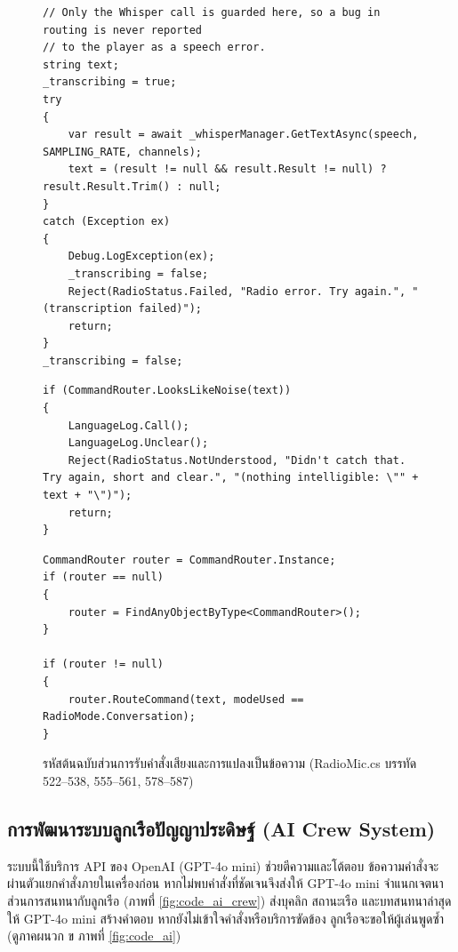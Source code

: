 \begin{figure}[!htbp]
\centering
\begin{lstlisting}[language={[Sharp]C},basicstyle=\ttfamily\footnotesize,firstnumber=522]
// Only the Whisper call is guarded here, so a bug in routing is never reported
// to the player as a speech error.
string text;
_transcribing = true;
try
{
    var result = await _whisperManager.GetTextAsync(speech, SAMPLING_RATE, channels);
    text = (result != null && result.Result != null) ? result.Result.Trim() : null;
}
catch (Exception ex)
{
    Debug.LogException(ex);
    _transcribing = false;
    Reject(RadioStatus.Failed, "Radio error. Try again.", "(transcription failed)");
    return;
}
_transcribing = false;
\end{lstlisting}
\vspace{0.3em}
\begin{lstlisting}[language={[Sharp]C},basicstyle=\ttfamily\footnotesize,firstnumber=555]
if (CommandRouter.LooksLikeNoise(text))
{
    LanguageLog.Call();
    LanguageLog.Unclear();
    Reject(RadioStatus.NotUnderstood, "Didn't catch that. Try again, short and clear.", "(nothing intelligible: \"" + text + "\")");
    return;
}
\end{lstlisting}
\vspace{0.3em}
\begin{lstlisting}[language={[Sharp]C},basicstyle=\ttfamily\footnotesize,firstnumber=578]
CommandRouter router = CommandRouter.Instance;
if (router == null)
{
    router = FindAnyObjectByType<CommandRouter>();
}

if (router != null)
{
    router.RouteCommand(text, modeUsed == RadioMode.Conversation);
}
\end{lstlisting}
\caption{รหัสต้นฉบับส่วนการรับคำสั่งเสียงและการแปลงเป็นข้อความ (RadioMic.cs บรรทัด 522--538, 555--561, 578--587)}
\label{fig:code_speech}
\end{figure}

\subsection{การพัฒนาระบบลูกเรือปัญญาประดิษฐ์ (AI Crew System)}
ระบบนี้ใช้บริการ API ของ OpenAI (GPT-4o mini) ช่วยตีความและโต้ตอบ ข้อความคำสั่งจะผ่านตัวแยกคำสั่งภายในเครื่องก่อน หากไม่พบคำสั่งที่ชัดเจนจึงส่งให้ GPT-4o mini จำแนกเจตนา ส่วนการสนทนากับลูกเรือ (ภาพที่ \ref{fig:code_ai_crew}) ส่งบุคลิก สถานะเรือ และบทสนทนาล่าสุดให้ GPT-4o mini สร้างคำตอบ หากยังไม่เข้าใจคำสั่งหรือบริการขัดข้อง ลูกเรือจะขอให้ผู้เล่นพูดซ้ำ (ดูภาคผนวก ข ภาพที่ \ref{fig:code_ai})


